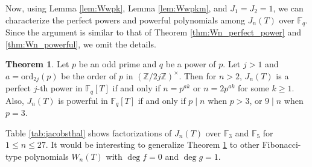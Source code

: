 \documentclass[letterpaper, 10pt]{article}
\newcommand{\bF}{\mathbb{F}}
\newcommand{\bZ}{\mathbb{Z}}
\newcommand{\1}{\mathds{1}}	%
\theoremstyle{definition}
\newtheorem{theorem}{Theorem}[section]
\theoremstyle{remark}
\begin{document}
Now, using Lemma \ref{lem:Wwpk}, Lemma \ref{lem:Wwpkm}, and $J_1 = J_2 = 1$, we can characterize the perfect powers and powerful polynomials among $J_n(T)$ over $\bF_q$.
Since the argument is similar to that of Theorem \ref{thm:Wn_perfect_power} and \ref{thm:Wn_powerful}, we omit the details.
\begin{theorem}
\label{thm:Jn}
    Let $p$ be an odd prime and $q$ be a power of $p$.
    Let $j > 1$ and $a = \mathrm{ord}_{2j}(p)$ be the order of $p$ in $(\bZ / 2j \bZ)^\times$.
    Then for $n > 2$, $J_n(T)$ is a perfect $j$-th power in $\bF_q[T]$ if and only if $n = p^{ak}$ or $n = 2p^{ak}$ for some $k \ge 1$.
    Also, $J_n(T)$ is powerful in $\bF_q[T]$ if and only if $p \mid n$ when $p > 3$, or $9 \mid n$ when $p = 3$.
\end{theorem}
Table \ref{tab:jacobsthal} shows factorizations of $J_n(T)$ over $\bF_3$ and $\bF_5$ for $1 \le n \le 27$.
It would be interesting to generalize Theorem \ref{thm:Jn} to other Fibonacci-type polynomials $W_n(T)$ with $\deg f = 0$ and $\deg g = 1$.
\end{document}

